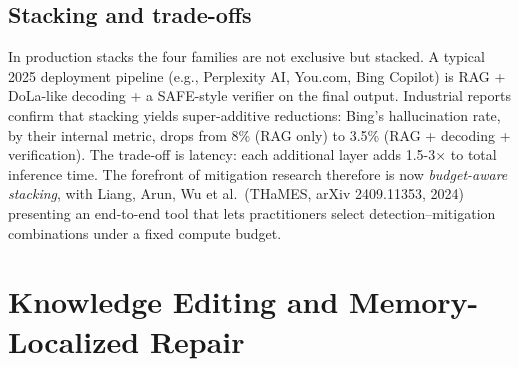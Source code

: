 \documentclass{article}
\begin{document}
\subsection{Stacking and trade-offs}\label{stacking-and-trade-offs}

In production stacks the four families are not exclusive but stacked. A typical 2025 deployment pipeline (e.g., Perplexity AI, You.com, Bing Copilot) is RAG + DoLa-like decoding + a SAFE-style verifier on the final output. Industrial reports confirm that stacking yields super-additive reductions: Bing's hallucination rate, by their internal metric, drops from 8\% (RAG only) to 3.5\% (RAG + decoding + verification). The trade-off is latency: each additional layer adds 1.5-3× to total inference time. The forefront of mitigation research therefore is now \emph{budget-aware stacking}, with Liang, Arun, Wu et al.~(THaMES, arXiv 2409.11353, 2024) presenting an end-to-end tool that lets practitioners select detection--mitigation combinations under a fixed compute budget.

\section{Knowledge Editing and Memory-Localized Repair}\label{knowledge-editing-and-memory-localized-repair}
\end{document}
